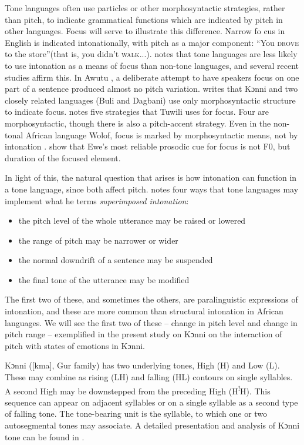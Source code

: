 \documentclass[output=paper]{langsci/langscibook}
\begin{document}
Tone languages often use particles or other morphosyntactic strategies, rather than pitch, to indicate grammatical functions which are indicated by pitch in other languages. Focus will serve to illustrate this difference. Narrow fo	cus in English is indicated intonationally, with pitch as a major component:  ``You \textsc{drove} to the store''(that is, you didn't  \textsc{walk}...). \citet[73]{cruttenden1997} notes that tone languages are less likely to use intonation as a means of focus than non-tone languages, and several recent studies affirm this. In Awutu \citep{Lomotey2014}, a deliberate attempt to have speakers focus on one part of a sentence produced almost no pitch variation. \citet{schwarz2009} writes that Kɔnni and two closely related languages (Buli and Dagbani) use only morphosyntactic structure to indicate focus. \citet{harley2009} notes five strategies that Tuwili uses for focus. Four are morphosyntactic, though there is also a pitch-accent strategy. Even in the non-tonal African language Wolof, focus is marked by morphosyntactic means, not by intonation \citep{riallandrobert2001}. \citet{fiedlerjannedy2013} show that Ewe's most reliable prosodic cue for focus is not F0, but duration of the focused element.

In light of this, the natural question that arises is how intonation can function in a tone language, since both affect pitch. \citet[9--10]{cruttenden1997} notes four ways that tone languages may implement what he terms \emph{superimposed intonation}:

\begin{itemize}
\item the pitch level of the whole utterance may be raised or lowered
\item the range of pitch may be narrower or wider
\item the normal downdrift of a sentence may be suspended
\item the final tone of the utterance may be modified
\end{itemize}

The first two of these, and sometimes the others, are paralinguistic expressions of intonation, and these are more common than structural intonation in African languages. We will see the first two of these -- change in pitch level and change in pitch range -- exemplified in the present study on Kɔnni on the interaction of pitch with states of emotions in Kɔnni.

Kɔnni ([kma], Gur family) has two underlying tones, High (H) and Low (L). These may combine as rising (LH) and falling (HL) contours on single syllables. A second High may be downstepped from the preceding High (H\textsuperscript{!}H). This sequence can appear on adjacent syllables or on a single syllable as a second type of falling tone. The tone-bearing unit is the syllable, to which one or two autosegmental tones may associate. A detailed presentation and analysis of Kɔnni tone can be found in \citet{cahill2007}. 
\end{document}
